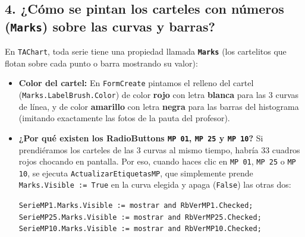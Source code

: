 \documentclass[11pt,a4paper]{article}
\begin{document}
\subsection{4. ¿Cómo se pintan los carteles con números (\texttt{Marks}) sobre las curvas y barras?}
En \texttt{TAChart}, toda serie tiene una propiedad llamada \textbf{\texttt{Marks}} (los cartelitos que flotan sobre cada punto o barra mostrando su valor):
\begin{itemize}[leftmargin=1.5em]
    \item \textbf{Color del cartel:} En \texttt{FormCreate} pintamos el relleno del cartel (\texttt{Marks.LabelBrush.Color}) de color \textbf{rojo} con letra \textbf{blanca} para las 3 curvas de línea, y de color \textbf{amarillo} con letra \textbf{negra} para las barras del histograma (imitando exactamente las fotos de la pauta del profesor).
    \item \textbf{¿Por qué existen los RadioButtons \texttt{MP 01}, \texttt{MP 25} y \texttt{MP 10}?}
    Si prendiéramos los carteles de las 3 curvas al mismo tiempo, habría 33 cuadros rojos chocando en pantalla. Por eso, cuando haces clic en \texttt{MP 01}, \texttt{MP 25} o \texttt{MP 10}, se ejecuta \texttt{ActualizarEtiquetasMP}, que simplemente prende \texttt{Marks.Visible := True} en la curva elegida y apaga (\texttt{False}) las otras dos:
    \begin{center}
    \texttt{SerieMP1.Marks.Visible := mostrar and RbVerMP1.Checked;}\\
    \texttt{SerieMP25.Marks.Visible := mostrar and RbVerMP25.Checked;}\\
    \texttt{SerieMP10.Marks.Visible := mostrar and RbVerMP10.Checked;}
    \end{center}
\end{itemize}
\end{document}
